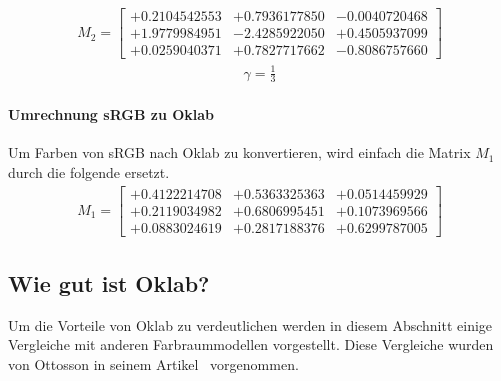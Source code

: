 \documentclass[12pt, a4paper, ngerman]{article}
\begin{document}
\begin{equation}
  \begin{aligned}
    M_2 = \begin{bmatrix} +0.2104542553 & +0.7936177850 & -0.0040720468 \\ +1.9779984951 & -2.4285922050 & +0.4505937099 \\ +0.0259040371 & +0.7827717662 & -0.8086757660 \end{bmatrix}
  \end{aligned}
\end{equation}
\begin{equation}
  \begin{aligned}
    \gamma = \frac{ 1 }{ 3 }
  \end{aligned}
\end{equation}

\paragraph{Umrechnung sRGB zu Oklab}
Um Farben von sRGB nach Oklab zu konvertieren, wird einfach die Matrix \(M_1\) durch die folgende ersetzt.
\begin{equation}
  \begin{aligned}
    M_1 = \begin{bmatrix} +0.4122214708 & +0.5363325363 & +0.0514459929 \\ +0.2119034982 & +0.6806995451 & +0.1073969566 \\ +0.0883024619 & +0.2817188376 & +0.6299787005 \end{bmatrix}
  \end{aligned}
\end{equation}

\subsection{Wie gut ist Oklab?}
Um die Vorteile von Oklab zu verdeutlichen werden in diesem Abschnitt einige Vergleiche mit anderen Farbraummodellen vorgestellt.
Diese Vergleiche wurden von Ottosson in seinem Artikel~\cite{Oklab_2020} vorgenommen.
\end{document}
